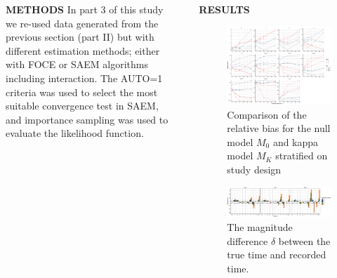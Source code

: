 \documentclass[final]{beamer}
\newlength{\sepwidth}
\newlength{\colwidth}
\newcommand{\separatorcolumn}{\begin{column}{\sepwidth}\end{column}}
\begin{document}
\begin{frame}[t]
\begin{columns}[t]
\begin{column}{\colwidth}
\begin{block}{\textbf{METHODS}}
In part 3 of this study we re-used data generated from the previous section (part II) but with different estimation methods; either with FOCE or SAEM algorithms including interaction. The AUTO=1 criteria was used to select the most suitable convergence test in SAEM, and importance sampling was used to evaluate the likelihood function.
  
  \end{block} 

\end{column}
\separatorcolumn

\begin{column}{0.6\paperwidth}
\begin{block}{\textbf{RESULTS}}
\begin{figure}
\centering
\includegraphics[width=55cm]{Figure1A}
\caption{Comparison of the relative bias for the null model $M_0$ and kappa model $M_K$ stratified on study design}
\end{figure} 
\begin{figure}
\centering
\includegraphics[width=55cm]{Figure3A.eps}
\caption{The magnitude difference $\delta$ between the true time and recorded time. }
\end{figure} 

\end{block}
\end{column}
\end{columns}
\end{frame}
\end{document}
